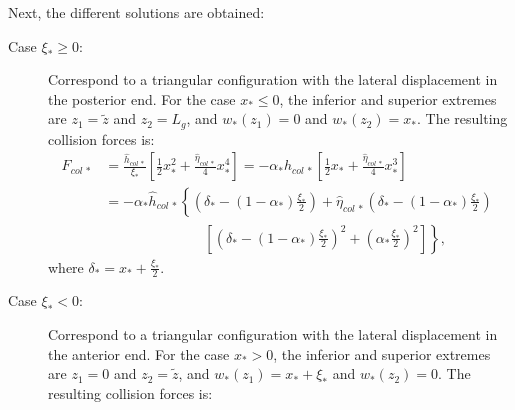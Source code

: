 \documentclass[a4paper,10pt]{article}
\begin{document}
Next, the different solutions are obtained:
\begin{description}
  \item[Case $\xi_{*} \geq 0$:]
    Correspond to a triangular configuration with the lateral displacement in the posterior end.
    For the case $x_{*} \leq 0$, the inferior and superior extremes are $z_1 = \tilde{z} $ and $z_2 = L_{g}$,
    and $w_{*}(z_1) = 0$ and $w_{*}(z_2) = x_{*}$.
    The resulting collision forces is:
    \begin{equation}
      \begin{aligned}
        F_{col\,*} & = \frac{\hat{h}_{col\,*}}{\xi_{*}} \left[\frac{1}{2} x_{*}^2 +
                         \frac{\hat{\eta}_{col\,*}}{4} x_{*}^4  \right]
                     = - \alpha_{*} \hat{h}_{col\,*} \left[\frac{1}{2} x_{*} +
                         \frac{\hat{\eta}_{col\,*}}{4} x_{*}^3  \right]     \\
                   & = - \alpha_{*} \hat{h}_{col\,*} \left\{
                            \left( \delta_{*} - (1 - \alpha_{*}) \frac{\xi_{*}}{2} \right)
                        + \hat{\eta}_{col\,*} \left( \delta_{*} - (1 - \alpha_{*}) \frac{\xi_{*}}{2} \right) 
                        ^{\phantom{2}} \right. \\
                   & \hspace{3cm}   \left.  \left[
                            \left( \delta_{*} - (1 - \alpha_{*}) \frac{\xi_{*}}{2} \right)^2 + 
                            \left( \alpha_{*} \frac{\xi_{*}}{2} \right)^2  \right] \right\},
      \end{aligned}
    \end{equation}
    where $\delta_{*} = x_{*} + \frac{\xi_{*}}{2}$.

  \item[Case $\xi_{*} < 0$:]
    Correspond to a triangular configuration with the lateral displacement in the anterior end.
    For the case $x_{*} > 0$, the inferior and superior extremes are $z_1 = 0 $ and $z_2 = \tilde{z}$,
    and $w_{*}(z_1) = x_{*}+\xi_{*}$ and $w_{*}(z_2) = 0$.
    The resulting collision forces is:
    

\end{description}
\end{document}
